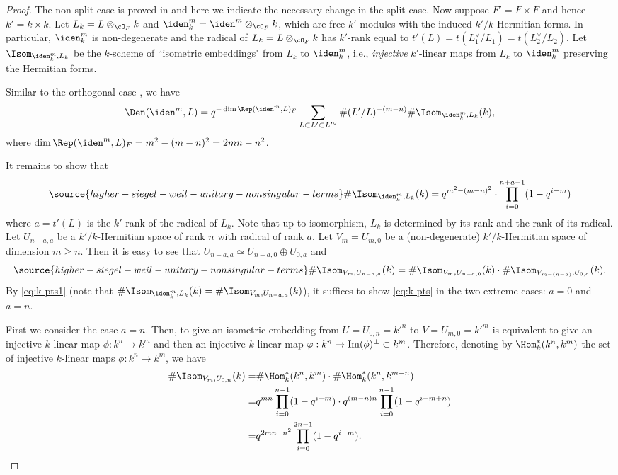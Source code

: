 \begin{proof}
The non-split case is proved in \cite[Thm.~3.5.1]{LZ1} and here we indicate the necessary change in the split case.  Now suppose $F'=F\times F$ and hence $k'=k\times k$. Let $L_k=L\otimes_{\cO_F} k$ and $\iden^m_{k}=\iden^m\otimes_{\cO_F} k$, which are free $k'$-modules with the induced $k'/k$-Hermitian forms. In particular, $\iden^m_{k}$ is non-degenerate and the radical of $L_k=L\otimes_{\cO_F} k$  has $k'$-rank equal to $t'(L)=t(L_1^\vee/L_1)=t(L_2^\vee/L_2)$. Let $\Isom_{\iden^m_{k}, L_k}$ be the $k$-scheme of ``isometric embeddings" from $L_k$ to  $\iden^m_{k}$, i.e., {\em injective} $k'$-linear maps from $L_k$ to  $\iden^m_{k}$ preserving the Hermitian forms.

Similar to the orthogonal case \cite[\S3.3]{CY},  we have
  $$
  \Den(\iden^m,L)= q^{-\dim \Rep(\iden^m,L)_{F}}\sum_{L\subset L'\subset L'^\vee} \# (L'/L)^{-(m-n)} \# \Isom_{\iden^m_{k}, L_k}(k),
  $$
  where $\dim \Rep(\iden^m,L)_{F}=m^2-(m-n)^2=2mn-n^2$.


It remains to show that
  \begin{align}\label{eq:k pts}
\source{higher-siegel-weil-unitary-nonsingular-terms}
   \#\Isom_{\iden^m_{k}, L_k}(k)= q^{m^2-(m-n)^2}\cdot \prod_{i=0}^{n+a-1}(1-q^{i-m})
  \end{align}
  where $a=t'(L)$ is the $k'$-rank of the radical of $L_k$. Note that up-to-isomorphism, $L_k$ is determined by its rank and the rank of its radical. Let $U_{n-a,a}$ be a $k'/k$-Hermitian space of rank $n$ with radical of rank $a$. Let $V_m=U_{m,0}$ be a (non-degenerate) $k'/k$-Hermitian space of dimension $m\ge n$. Then it is easy to see that $U_{n-a,a}\simeq U_{n-a,0}\oplus U_{0,a}$ and
  \begin{equation}\label{eq:k pts1}
\source{higher-siegel-weil-unitary-nonsingular-terms}
 \# \Isom_{V_m, U_{n-a,a}}(k)= \# \Isom_{V_m, U_{n-a,0}}(k)\cdot\#  \Isom_{V_{m-(n-a)}, U_{0,a}}(k).
  \end{equation}
By \eqref{eq:k pts1} (note that $   \#\Isom_{\iden^m_{k}, L_k}(k)= \# \Isom_{V_m, U_{n-a,a}}(k)$), it suffices to show \eqref{eq:k pts} in the two extreme cases: $a=0$ and $a=n$.

 First we consider the case $a=n$. Then, to give an isometric embedding from $U=U_{0,n}=k'^n$ to $V=U_{m,0}=k'^m$ is equivalent to give an injective $k$-linear map $\phi:k^n\to k^m$ and then an injective $k$-linear map $\varphi:k^n\to {\rm Im}(\phi)^\perp\subset k^m$. Therefore, denoting  by $\Hom^*_k(k^n,k^m)$ the set of  injective $k$-linear maps $\phi:k^n\to k^m$, we have
  \begin{align*}
 \# \Isom_{V_{m}, U_{0,n}}(k)= &\#\Hom^*_k(k^n,k^m)\cdot  \#\Hom^*_k(k^n,k^{m-n})\\
 =&q^{mn}\prod_{i=0}^{n-1}(1-q^{i-m})\cdot  q^{(m-n)n}\prod_{i=0}^{n-1}(1-q^{i-m+n})
 \\=&  q^{2mn-n^2}\prod_{i=0}^{2n-1}(1-q^{i-m}).
  \end{align*}


\end{proof}
